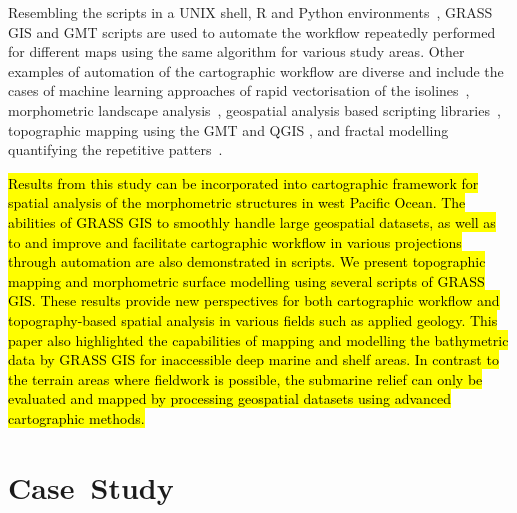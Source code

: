 \documentclass[technologies,article,accept,pdftex,moreauthors]{Definitions/mdpi}
\begin{document}
{Resembling the} scripts in a UNIX shell, R and Python environments~\cite{jimaging8120317}, GRASS GIS and GMT scripts{ }are used to automate the workflow repeatedly performed for different maps using the same algorithm for various study areas. Other examples of automation of the cartographic workflow are diverse and include the cases of machine learning approaches of rapid vectorisation of the isolines~\cite{Lemenkova2020e}, morphometric landscape analysis~\cite{Clarke,Sofia}, geospatial analysis based scripting libraries~\cite{su142315966}, topographic mapping using the GMT and {QGIS} \cite{LemenkovaDebeir2022JAES}, and fractal modelling quantifying the repetitive patters~\cite{Malinverno}. 

\hl{Results from this study can be incorporated into cartographic framework for spatial analysis of the morphometric structures in west Pacific Ocean. The abilities of GRASS GIS to smoothly handle large geospatial datasets, as well as to and improve and facilitate cartographic workflow in various projections through automation are also demonstrated in scripts. We present topographic mapping and morphometric surface modelling using several scripts of GRASS GIS. These results provide new perspectives for both cartographic workflow and topography-based spatial analysis in various fields such as applied geology. This paper also highlighted the capabilities of mapping and modelling the bathymetric data by GRASS GIS for inaccessible deep marine and shelf areas. In contrast to the terrain areas where fieldwork is possible, the submarine relief can only be evaluated and mapped by processing geospatial datasets using advanced cartographic methods.}

\section{Case~Study}

\end{document}
